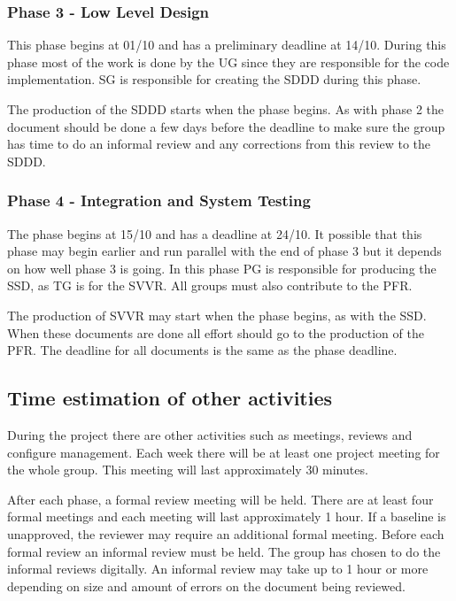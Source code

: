 \documentclass{article}
\begin{document}
\subsubsection{Phase 3 - Low Level Design}
This phase begins at 01/10 and has a preliminary deadline at 14/10. During this phase most of the work is done by the UG since they are responsible for the code implementation. SG is responsible for creating the SDDD during this phase.

The production of the SDDD starts when the phase begins. As with phase 2 the document should be done a few days before the deadline to make sure the group has time to do an informal review and any corrections from this review to the SDDD.

\subsubsection{Phase 4 - Integration and System Testing}
The phase begins at 15/10 and has a deadline at 24/10. It possible that this phase may begin earlier and run parallel with the end of phase 3 but it depends on how well phase 3 is going. In this phase PG is responsible for producing the SSD, as TG is for the SVVR. All groups must also contribute to the PFR. 

The production of SVVR may start when the phase begins, as with the SSD. When these documents are done all effort should go to the production of the PFR. The deadline for all documents is the same as the phase deadline.  

\subsection{Time estimation of other activities}
During the project there are other activities such as meetings, reviews and configure management. Each week there will be at least one project meeting for the whole group. This meeting will last approximately 30 minutes. 

After each phase, a formal review meeting will be held. There are at least four formal meetings and each meeting will last approximately 1 hour. If a baseline is unapproved, the reviewer may require an additional formal meeting. Before each formal review an informal review must be held. The group has chosen to do the informal reviews digitally. An informal review may take up to 1 hour or more depending on size and amount of errors on the document being reviewed.
\end{document}
